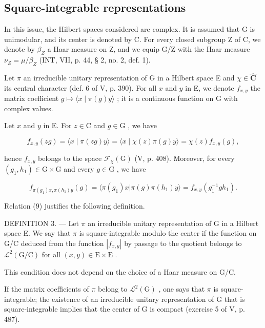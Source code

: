 \subsection{Square-integrable representations}

In this issue, the Hilbert spaces considered are complex. It is assumed that G is unimodular, and its center is denoted by C. For every closed subgroup Z of C, we denote by \(\beta_{Z}\) a Haar measure on Z, and we equip G/Z with the Haar measure \(\nu_{Z} = \mu/\beta_{Z}\) (INT, VII, p. 44, § 2, no. 2, def. 1).

Let \(\pi\) an irreducible unitary representation of G in a Hilbert space E and \(\chi \in \widehat{\mathbf{C}}\) its central character (def. 6 of V, p. 390). For all \(x\) and \(y\) in E, we denote \(f_{x,y}\) the matrix coefficient \(g \mapsto \langle x \mid \pi(g)y \rangle\) ; it is a continuous function on G with complex values.

Let \(x\) and \(y\) in E. For \(z \in \mathrm{C}\) and \(g \in \mathrm{G}\) , we have

\[
f _ {x, y} (z g) = \langle x \mid \pi (z g) y \rangle = \langle x \mid \chi (z) \pi (g) y \rangle = \chi (z) f _ {x, y} (g),\tag{9}
\]

hence \(f_{x,y}\) belongs to the space \(\mathcal{F}_{\chi}(\mathrm{G})\) (V, p. 408). Moreover, for every \((g_1, h_1) \in \mathrm{G} \times \mathrm{G}\) and every \(g \in \mathrm{G}\) , we have

\[
f _ {\pi (g _ {1}) x, \pi (h _ {1}) y} (g) = \langle \pi (g _ {1}) x | \pi (g) \pi (h _ {1}) y \rangle = f _ {x, y} (g _ {1} ^ {- 1} g h _ {1}).\tag{10}
\]

Relation (9) justifies the following definition.

DEFINITION 3. --- Let \(\pi\) an irreducible unitary representation of G in a Hilbert space E. We say that \(\pi\) is square-integrable modulo the center if the function on G/C deduced from the function \(|f_{x,y}|\) by passage to the quotient belongs to \(\mathcal{L}^2 (\mathrm{G / C})\) for all \((x,y)\in \mathrm{E}\times \mathrm{E}\) .

This condition does not depend on the choice of a Haar measure on G/C.

If the matrix coefficients of \(\pi\) belong to \(\mathcal{L}^2 (\mathrm{G})\) , one says that \(\pi\) is square-integrable; the existence of an irreducible unitary representation of G that is square-integrable implies that the center of G is compact (exercise 5 of V, p. 487).

